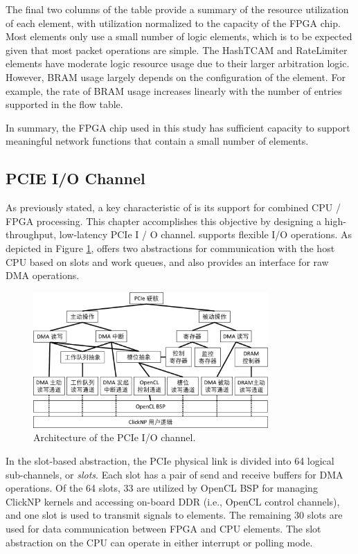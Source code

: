 The final two columns of the table provide a summary of the resource utilization of each element, with utilization normalized to the capacity of the FPGA chip. Most elements only use a small number of logic elements, which is to be expected given that most packet operations are simple. The HashTCAM and RateLimiter elements have moderate logic resource usage due to their larger arbitration logic. However, BRAM usage largely depends on the configuration of the element. For example, the rate of BRAM usage increases linearly with the number of entries supported in the flow table. 

In summary, the FPGA chip used in this study has sufficient capacity to support meaningful network functions that contain a small number of elements.

\subsection{PCIE I/O Channel}
\label{clicknp:subsec:pcie}

As previously stated, a key characteristic of \name is its support for combined CPU / FPGA processing. This chapter accomplishes this objective by designing a high-throughput, low-latency PCIe I / O channel. \name supports flexible I/O operations. As depicted in Figure \ref{clicknp:fig:pcie-io}, \name offers two abstractions for communication with the host CPU based on slots and work queues, and also provides an interface for raw DMA operations.

\begin{figure}[htbp]
	\centering
	\includegraphics[width=0.8\textwidth]{image/pcie-io}
	\caption{Architecture of the PCIe I/O channel.}
	\label{clicknp:fig:pcie-io}
\end{figure}

In the slot-based abstraction, the PCIe physical link is divided into 64 logical sub-channels, or \textit {slots}. Each slot has a pair of send and receive buffers for DMA operations. Of the 64 slots, 33 are utilized by OpenCL BSP for managing ClickNP kernels and accessing on-board DDR (i.e., OpenCL control channels), and one slot is used to transmit signals to \name elements. The remaining 30 slots are used for data communication between FPGA and CPU elements. The slot abstraction on the CPU can operate in either interrupt or polling mode.

